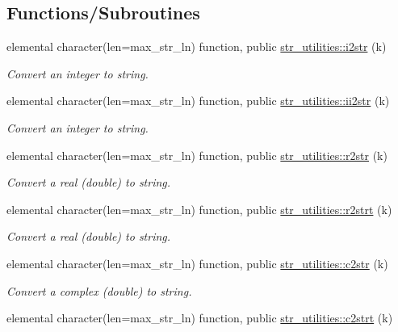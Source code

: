 \subsection*{Functions/\+Subroutines}
\begin{DoxyCompactItemize}
\item 
elemental character(len=max\+\_\+str\+\_\+ln) function, public \hyperlink{namespacestr__utilities_a0b97e51770725a3e98ed393d26681414}{str\+\_\+utilities\+::i2str} (k)
\begin{DoxyCompactList}\small\item\em Convert an integer to string. \end{DoxyCompactList}\item 
elemental character(len=max\+\_\+str\+\_\+ln) function, public \hyperlink{namespacestr__utilities_acb8c4e66aead51f178e47fdea8d7a7db}{str\+\_\+utilities\+::ii2str} (k)
\begin{DoxyCompactList}\small\item\em Convert an integer to string. \end{DoxyCompactList}\item 
elemental character(len=max\+\_\+str\+\_\+ln) function, public \hyperlink{namespacestr__utilities_a92ac6c0af1979df094de1caddd28ade0}{str\+\_\+utilities\+::r2str} (k)
\begin{DoxyCompactList}\small\item\em Convert a real (double) to string. \end{DoxyCompactList}\item 
elemental character(len=max\+\_\+str\+\_\+ln) function, public \hyperlink{namespacestr__utilities_ac778d706b2e021672618939ab58fdd32}{str\+\_\+utilities\+::r2strt} (k)
\begin{DoxyCompactList}\small\item\em Convert a real (double) to string. \end{DoxyCompactList}\item 
elemental character(len=max\+\_\+str\+\_\+ln) function, public \hyperlink{namespacestr__utilities_a308e943e5e244e3e0f852f2ecb3e3183}{str\+\_\+utilities\+::c2str} (k)
\begin{DoxyCompactList}\small\item\em Convert a complex (double) to string. \end{DoxyCompactList}\item 
elemental character(len=max\+\_\+str\+\_\+ln) function, public \hyperlink{namespacestr__utilities_abca28d6272d447dc1c0c100624c6ed75}{str\+\_\+utilities\+::c2strt} (k)

\end{DoxyCompactItemize}
